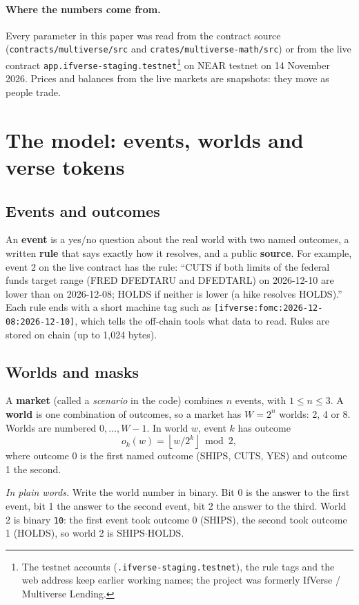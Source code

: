 \documentclass[11pt,a4paper]{article}
\newcommand{\wSH}{\textsf{SHIPS$\cdot$HOLDS}}
\newcommand{\code}[1]{\texttt{\small #1}}
\newcommand{\inwords}[1]{\par\noindent\colorbox{note}{\parbox{\dimexpr\linewidth-2\fboxsep}{\small\textit{In plain words.} #1}}\par}
\begin{document}
\paragraph{Where the numbers come from.} Every parameter in this paper was read from the contract source
(\code{contracts/multiverse/src} and \code{crates/multiverse-math/src}) or from the live contract
\code{app.ifverse-staging.testnet}\footnote{The testnet accounts (\code{*.ifverse-staging.testnet}), the rule tags and the web address keep earlier working names; the project was formerly IfVerse / Multiverse Lending.} on NEAR testnet on 14 November 2026. Prices and balances from the live markets are
snapshots: they move as people trade.

\section{The model: events, worlds and verse tokens}
\label{sec:model}

\subsection{Events and outcomes}

An \textbf{event} is a yes/no question about the real world with two named outcomes, a written \textbf{rule} that
says exactly how it resolves, and a public \textbf{source}. For example, event 2 on the live contract has the rule:
``CUTS if both limits of the federal funds target range (FRED DFEDTARU and DFEDTARL) on 2026-12-10 are lower than on
2026-12-08; HOLDS if neither is lower (a hike resolves HOLDS).'' Each rule ends with a short machine tag such as
\code{[ifverse:fomc:2026-12-08:2026-12-10]}, which tells the off-chain tools what data to read. Rules are stored on
chain (up to 1,024 bytes).

\subsection{Worlds and masks}

A \textbf{market} (called a \emph{scenario} in the code) combines $n$ events, with $1 \le n \le 3$. A
\textbf{world} is one combination of outcomes, so a market has $W = 2^n$ worlds: 2, 4 or 8. Worlds are numbered
$0,\dots,W-1$. In world $w$, event $k$ has outcome
\begin{equation}
  o_k(w) = \left\lfloor w / 2^k \right\rfloor \bmod 2 ,
  \label{eq:outcome}
\end{equation}
where outcome 0 is the first named outcome (\textsf{SHIPS}, \textsf{CUTS}, \textsf{YES}) and outcome 1 the second.
\inwords{Write the world number in binary. Bit 0 is the answer to the first event, bit 1 the answer to the second
event, bit 2 the answer to the third. World 2 is binary \code{10}: the first event took outcome 0 (\textsf{SHIPS}),
the second took outcome 1 (\textsf{HOLDS}), so world 2 is \wSH.}
\end{document}
